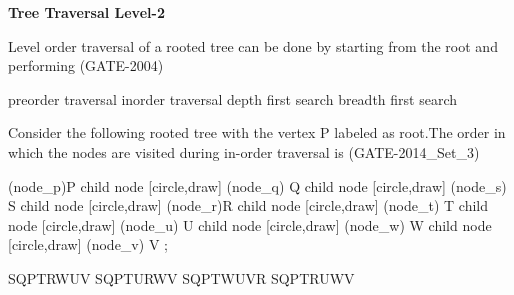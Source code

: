 
\centerline{\textbf{ \LARGE Tree Traversal Level-2}}

\begin{questyle}
  \question  Level order traversal of a rooted tree can be done by starting from the root and performing  (GATE-2004)

  \begin{choices}
    \choice         preorder traversal
    \choice         inorder traversal
    \choice         depth first search
    \CorrectChoice  breadth first search
  \end{choices}
\end{questyle}

\begin{questyle}
  \question  Consider the following rooted tree with the vertex P labeled as root.The order
            in which the nodes are visited during in-order traversal is  (GATE-2014\_Set\_3)

\begin{myTree}
   (node_p){P}
    child
    {
        node [circle,draw] (node_q) {Q}
        child
        {
            node [circle,draw] (node_s) {S}
        }
    }
    child
    {
        node [circle,draw] (node_r){R}
        child
        {
            node [circle,draw] (node_t) {T}
        }
        child
        {
            node [circle,draw] (node_u) {U}
            child
            {
              node [circle,draw] (node_w) {W}
            }
        }
        child
        {
            node [circle,draw] (node_v) {V}
        }
    };
\end{myTree}

  \begin{oneparchoices}
    \CorrectChoice  SQPTRWUV
    \choice         SQPTURWV
    \choice         SQPTWUVR
    \choice         SQPTRUWV
  \end{oneparchoices}
\end{questyle}


